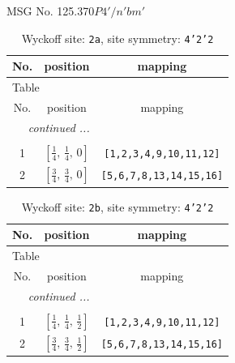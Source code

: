 \documentclass[fleqn,8pt]{jsarticle}
\begin{document}
\setcounter{MaxMatrixCols}{32}

\renewcommand{\tablename}{Table~}
\renewcommand{\figurename}{Figure~}
\begin{center}
\LARGE
MSG No. 125.370\quad$P4'/n'bm'$
\end{center}
\renewcommand{\arraystretch}{1.2}
\begin{longtable}{ccc}
\caption{Wyckoff site: {\tt 2a}, site symmetry: {\tt 4'2'2}}
 \\
 \hline \hline
No. & position & mapping \\ \hline \endfirsthead

\multicolumn{2}{l}{\tablename\ \thetable{}} \\
 \hline \hline
No. & position & mapping \\ \hline \endhead

 \hline \hline
\multicolumn{2}{r}{\footnotesize\it continued ...} \\ \endfoot

 \hline \hline
\multicolumn{2}{r}{} \\ \endlastfoot

1 & $\left[ \frac{1}{4},\, \frac{1}{4},\, 0 \right]$ & {\tt [1,2,3,4,9,10,11,12]} \\ \hline
2 & $\left[ \frac{3}{4},\, \frac{3}{4},\, 0 \right]$ & {\tt [5,6,7,8,13,14,15,16]} \\
\end{longtable}
\renewcommand{\arraystretch}{1.2}
\begin{longtable}{ccc}
\caption{Wyckoff site: {\tt 2b}, site symmetry: {\tt 4'2'2}}
 \\
 \hline \hline
No. & position & mapping \\ \hline \endfirsthead

\multicolumn{2}{l}{\tablename\ \thetable{}} \\
 \hline \hline
No. & position & mapping \\ \hline \endhead

 \hline \hline
\multicolumn{2}{r}{\footnotesize\it continued ...} \\ \endfoot

 \hline \hline
\multicolumn{2}{r}{} \\ \endlastfoot

1 & $\left[ \frac{1}{4},\, \frac{1}{4},\, \frac{1}{2} \right]$ & {\tt [1,2,3,4,9,10,11,12]} \\ \hline
2 & $\left[ \frac{3}{4},\, \frac{3}{4},\, \frac{1}{2} \right]$ & {\tt [5,6,7,8,13,14,15,16]} \\
\end{longtable}
\end{document}
